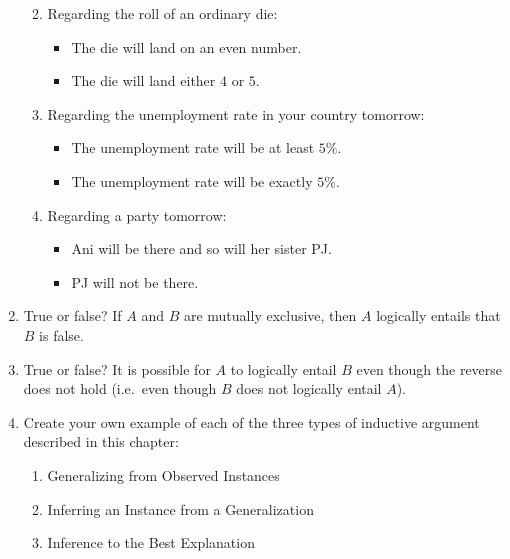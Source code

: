 \documentclass[justified]{tufte-book}
\providecommand{\tightlist}{%
  \setlength{\itemsep}{0pt}\setlength{\parskip}{0pt}}
\theoremstyle{definition}
\theoremstyle{definition}
\theoremstyle{definition}
\theoremstyle{remark}
\begin{document}
\begin{enumerate}
  \begin{enumerate}
  \def\labelenumii{\alph{enumii}.}
  \item
    Regarding the roll of an ordinary die:

    \begin{itemize}
    \tightlist
    \item
      The die will land on an even number.
    \item
      The die will land either \(4\) or \(5\).
    \end{itemize}
  \item
    Regarding the unemployment rate in your country tomorrow:

    \begin{itemize}
    \tightlist
    \item
      The unemployment rate will be at least \(5\%\).
    \item
      The unemployment rate will be exactly \(5\%\).
    \end{itemize}
  \item
    Regarding a party tomorrow:

    \begin{itemize}
    \tightlist
    \item
      Ani will be there and so will her sister PJ.
    \item
      PJ will not be there.
    \end{itemize}
  \end{enumerate}
\item
  True or false? If \(A\) and \(B\) are mutually exclusive, then \(A\)
  logically entails that \(B\) is false.
\item
  True or false? It is possible for \(A\) to logically entail \(B\) even
  though the reverse does not hold (i.e.~even though \(B\) does not
  logically entail \(A\)).
\item
  Create your own example of each of the three types of inductive
  argument described in this chapter:

  \begin{enumerate}
  \def\labelenumii{\alph{enumii}.}
  \tightlist
  \item
    Generalizing from Observed Instances
  \item
    Inferring an Instance from a Generalization
  \item
    Inference to the Best Explanation
  \end{enumerate}
\end{enumerate}
\end{document}
